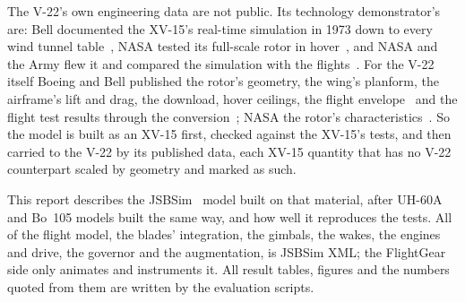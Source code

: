 \documentclass[10pt,a4paper,twocolumn]{article}
\begin{document}
The V-22's own engineering data are not public. Its technology demonstrator's are: Bell documented the XV-15's real-time
simulation in 1973 down to every wind tunnel table~\cite{cr}, NASA tested its full-scale rotor in hover~\cite{fb}, and NASA and the
Army flew it and compared the simulation with the flights~\cite{cd,ma}. For the V-22 itself Boeing and Bell published the rotor's
geometry, the wing's planform, the airframe's lift and drag, the download, hover ceilings, the flight envelope~\cite{rc} and the
flight test results through the conversion~\cite{pd}; NASA the rotor's characteristics~\cite{ac,wj}. So the model is built as an
XV-15 first, checked against the XV-15's tests, and then carried to the V-22 by its published data, each XV-15 quantity that has
no V-22 counterpart scaled by geometry and marked as such.

This report describes the JSBSim~\cite{jsbsim} model built on that material, after UH-60A and Bo~105 models built the same way, and
how well it reproduces the tests. All of the flight model, the blades' integration, the gimbals, the wakes, the engines and drive,
the governor and the augmentation, is JSBSim XML; the FlightGear side only animates and instruments it. All result tables, figures
and the numbers quoted from them are written by the evaluation scripts.

\end{document}
